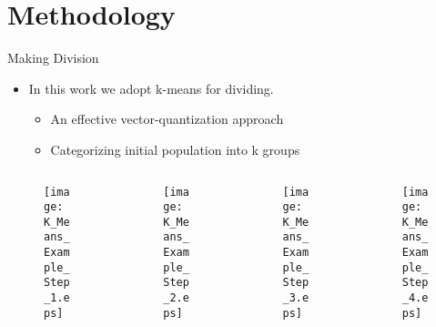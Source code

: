 \section{Methodology}


\begin{frame}{Making Division}
  \begin{itemize}
    \item In this work we adopt k-means for dividing.
        \begin{itemize}
          \item An effective vector-quantization approach
          \item Categorizing initial population into k groups
        \end{itemize}
    \end{itemize}
    \begin{columns}
      \begin{column}{0.2\textwidth}
        \begin{figure}
          \texttt{[image: K\_Means\_Example\_Step\_1.eps]}
        \end{figure}
        
      \end{column}
      \begin{column}{0.2\textwidth}
        \begin{figure}
          \texttt{[image: K\_Means\_Example\_Step\_2.eps]}
        \end{figure}
        
      \end{column}
      \begin{column}{0.2\textwidth}
        \begin{figure}
          \texttt{[image: K\_Means\_Example\_Step\_3.eps]}
        \end{figure}
        
      \end{column}
      \begin{column}{0.2\textwidth}
        \begin{figure}
          \texttt{[image: K\_Means\_Example\_Step\_4.eps]}
        \end{figure}
        
      \end{column}
    \end{columns}

\end{frame}


